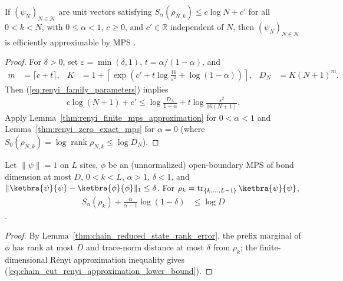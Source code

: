\begin{theorem}
    \label{thm:renyi_family_mps_approximation}
    \leanok
    If $(\psi_N)_{N\in\mathcal N}$ are unit vectors satisfying
    $S_\alpha(\rho_{N,k})\le c\log N+c'$ for all $0<k<N$, with $0\le\alpha<1$,
    $c\ge0$, and $c'\in\mathbb R$ independent of $N$, then
    $(\psi_N)_{N\in\mathcal N}$ is efficiently approximable by MPS
    \cite{Schuch2008EntropyScaling}.
\end{theorem}
\begin{proof}
    \leanok
    For $\delta>0$, set $\varepsilon=\min(\delta,1)$, $t=\alpha/(1-\alpha)$, and
    \begin{align}
        m                                   & =\lceil c+t\rceil, &
        K                                   & =1+\left\lceil
        \exp\left(c'+t\log\frac{16}{\varepsilon^2}
        +\log(1-\alpha)\right)\right\rceil, &
        D_N                                 & =K(N+1)^m.
        \label{eq:renyi_family_parameters}
    \end{align}
    Then (\ref{eq:renyi_family_parameters}) implies
    \begin{align}
        c\log(N+1)+c'\le
        \log\frac{D_N}{1-\alpha}
        +t\log\frac{\varepsilon^2}{16(N+1)}.
        \label{eq:renyi_family_entropy_threshold}
    \end{align}
    Apply Lemma~\ref{thm:renyi_finite_mps_approximation} for $0<\alpha<1$ and
    Lemma~\ref{thm:renyi_zero_exact_mps} for $\alpha=0$ (where
    $S_0(\rho_{N,k})=\log\operatorname{rank}\rho_{N,k}\le\log D_N$).
\end{proof}

\begin{lemma}
    \label{thm:chain_cut_renyi_approximation_lower_bound}
    \leanok
    Let $\|\psi\|=1$ on $L$ sites, $\phi$ be an (unnormalized) open-boundary MPS
    of bond dimension at most $D$, $0<k<L$, $\alpha>1$, $\delta<1$, and
    $\lVert\ketbra{\psi}{\psi}-\ketbra{\phi}{\phi}\rVert_1\le\delta$. For
    $\rho_k=\operatorname{tr}_{\{k,\dots,L-1\}}\ketbra{\psi}{\psi}$,
    \begin{align}
        \label{eq:chain_cut_renyi_approximation_lower_bound}
        S_\alpha(\rho_k)+\frac{\alpha}{\alpha-1}\log(1-\delta) & \le\log D
    \end{align}
    \cite{Schuch2008EntropyScaling,gap:swvc08_renyi_bond_dimension_sign}.
\end{lemma}
\begin{proof}\leanok
    By Lemma~\ref{thm:chain_reduced_state_rank_error}, the prefix marginal of
    $\phi$ has rank at most $D$ and trace-norm distance at most $\delta$ from
    $\rho_k$; the finite-dimensional Rényi approximation inequality gives
    (\ref{eq:chain_cut_renyi_approximation_lower_bound}).
\end{proof}

